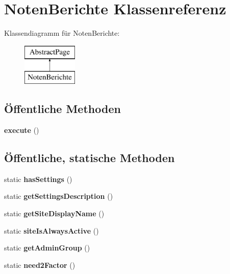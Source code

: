 \hypertarget{class_noten_berichte}{}\section{Noten\+Berichte Klassenreferenz}
\label{class_noten_berichte}
Klassendiagramm für Noten\+Berichte\+:\begin{figure}[H]
\begin{center}
\leavevmode
\includegraphics[height=2.000000cm]{class_noten_berichte}
\end{center}
\end{figure}
\subsection*{Öffentliche Methoden}
\begin{DoxyCompactItemize}
\item 
\mbox{\label{class_noten_berichte_a5f78ded3c54b26bc9f66d14014d7eb7b}} 
{\bfseries execute} ()
\end{DoxyCompactItemize}
\subsection*{Öffentliche, statische Methoden}
\begin{DoxyCompactItemize}
\item 
\mbox{\label{class_noten_berichte_a9f4282254ac6013feceebdb1c98338aa}} 
static {\bfseries has\+Settings} ()
\item 
\mbox{\label{class_noten_berichte_aeea2ce8010f22d08acc49bde58afbe76}} 
static {\bfseries get\+Settings\+Description} ()
\item 
\mbox{\label{class_noten_berichte_a493af90cb8c0ab1adad0e16f98072b80}} 
static {\bfseries get\+Site\+Display\+Name} ()
\item 
\mbox{\label{class_noten_berichte_a4459e5e88d962656d21de26f12222645}} 
static {\bfseries site\+Is\+Always\+Active} ()
\item 
\mbox{\label{class_noten_berichte_a42269881ab93691b93dde09e9d5ba321}} 
static {\bfseries get\+Admin\+Group} ()
\item 
\mbox{\label{class_noten_berichte_aad34d73ec6d4736b7d9bd366e6fc917d}} 
static {\bfseries need2\+Factor} ()
\end{DoxyCompactItemize}
